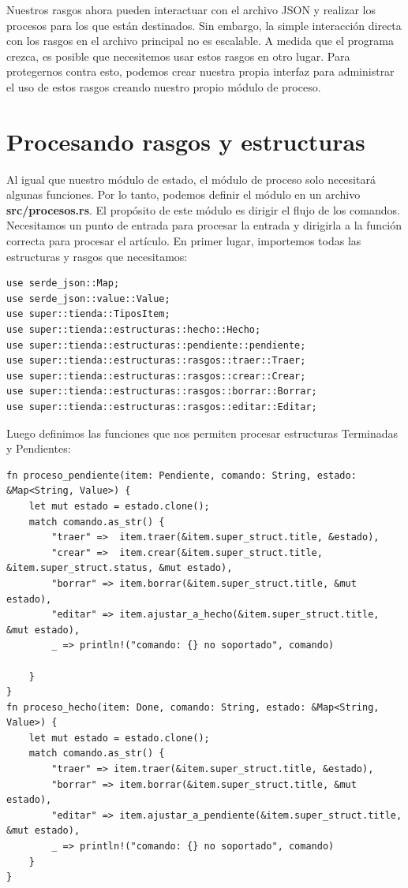 Nuestros rasgos ahora pueden interactuar con el archivo JSON y realizar los procesos para los que están destinados. Sin embargo, la simple interacción directa con los rasgos en el archivo principal no es escalable. A medida que el programa crezca, es posible que necesitemos usar estos rasgos en otro lugar. Para protegernos contra esto, podemos crear nuestra propia interfaz para administrar el uso de estos rasgos creando nuestro propio módulo de proceso.

\section{Procesando rasgos y estructuras}

Al igual que nuestro módulo de estado, el módulo de proceso solo necesitará algunas funciones. Por lo tanto, podemos definir el módulo en un archivo \textbf{src/procesos.rs}. El propósito de este módulo es dirigir el flujo de los comandos. Necesitamos un punto de entrada para procesar la entrada y dirigirla a la función correcta para procesar el artículo. En primer lugar, importemos todas las estructuras y rasgos que necesitamos:

\begin{lstlisting}
use serde_json::Map;
use serde_json::value::Value;
use super::tienda::TiposItem;
use super::tienda::estructuras::hecho::Hecho;
use super::tienda::estructuras::pendiente::pendiente;
use super::tienda::estructuras::rasgos::traer::Traer;
use super::tienda::estructuras::rasgos::crear::Crear;
use super::tienda::estructuras::rasgos::borrar::Borrar;
use super::tienda::estructuras::rasgos::editar::Editar;
\end{lstlisting}

Luego definimos las funciones que nos permiten procesar estructuras Terminadas y Pendientes:

\begin{lstlisting}
fn proceso_pendiente(item: Pendiente, comando: String, estado: &Map<String, Value>) {
	let mut estado = estado.clone();
	match comando.as_str() {
		"traer" =>  item.traer(&item.super_struct.title, &estado),
		"crear" =>  item.crear(&item.super_struct.title, &item.super_struct.status, &mut estado),
		"borrar" => item.borrar(&item.super_struct.title, &mut estado),
		"editar" => item.ajustar_a_hecho(&item.super_struct.title, &mut estado),
		_ => println!("comando: {} no soportado", comando)
		
	}
}
fn proceso_hecho(item: Done, comando: String, estado: &Map<String, Value>) {
	let mut estado = estado.clone();
	match comando.as_str() {
		"traer" => item.traer(&item.super_struct.title, &estado),
		"borrar" => item.borrar(&item.super_struct.title, &mut estado),
		"editar" => item.ajustar_a_pendiente(&item.super_struct.title, &mut estado),
		_ => println!("comando: {} no soportado", comando)
	}
}
\end{lstlisting}


